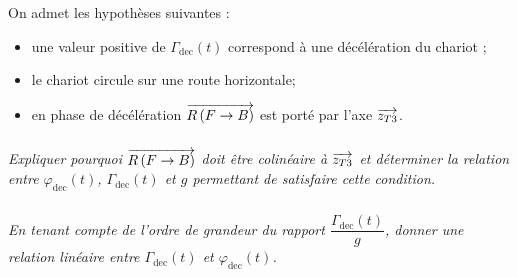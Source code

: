 \documentclass[10pt,fleqn]{article} %
\begin{document}
On admet les hypothèses suivantes :
\begin{itemize}
\item une valeur positive de $\Gamma_{\text{dec}}(t)$ correspond à une décélération du chariot ; 
\item le chariot circule sur une route horizontale;
\item en phase de décélération $\overrightarrow{R\left( {F} \rightarrow {B}\right)}$ est porté par l'axe $\overrightarrow{z_{T3}}$.
\end{itemize}

\subparagraph{}
\textit{Expliquer pourquoi $\overrightarrow{R\left( {F} \rightarrow {B}\right)}$ doit être colinéaire à $\overrightarrow{z_{T3}}$ et déterminer la relation entre $\varphi_{\text{dec}}(t)$, $\Gamma_{\text{dec}}(t)$ et $g$ permettant de satisfaire cette condition.}

\subparagraph{}
\textit{En tenant compte de l’ordre de grandeur du rapport $\dfrac{\Gamma_{\text{dec}}(t)}{g}$, donner une relation linéaire entre $\Gamma_{\text{dec}}(t)$ et $\varphi_{\text{dec}}(t)$.}

%
%
%
%
%
%
\end{document}

